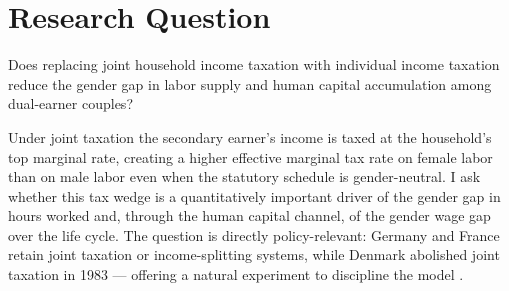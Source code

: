 \section{Research Question}

\begin{itshape}
Does replacing joint household income taxation with individual income taxation reduce the gender gap in labor supply and human capital accumulation among dual-earner couples?
\end{itshape}
\noindent Under joint taxation the secondary earner's income is taxed at the household's top marginal rate, creating a higher effective marginal tax rate on female labor than on male labor even when the statutory schedule is gender-neutral.
I ask whether this tax wedge is a quantitatively important driver of the gender gap in hours worked and, through the human capital channel, of the gender wage gap over the life cycle.
The question is directly policy-relevant: Germany and France retain joint taxation or income-splitting systems, while Denmark abolished joint taxation in 1983 --- offering a natural experiment to discipline the model \citep{bick2017taxation}.\vspace{-1em}
